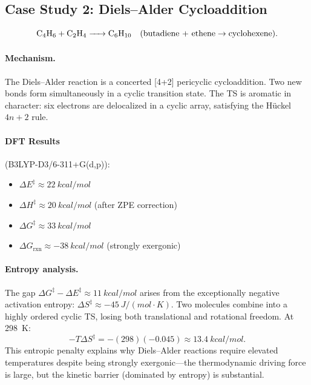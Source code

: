 \documentclass[11pt]{article}
\numberwithin{equation}{section}
\begin{document}
\subsection{Case Study 2: Diels--Alder Cycloaddition}

\begin{equation}
\ce{C4H6 + C2H4 -> C6H10} \quad (\text{butadiene + ethene} \to \text{cyclohexene}).
\end{equation}

\paragraph{Mechanism.} The Diels--Alder reaction is a concerted [4+2] pericyclic cycloaddition. Two new  bonds form simultaneously in a cyclic transition state. The TS is aromatic in character: six electrons are delocalized in a cyclic array, satisfying the H\"{u}ckel $4n+2$ rule.

\paragraph{DFT Results} (B3LYP-D3/6-311+G(d,p)):
\begin{itemize}
\item $\Delta E^\ddagger \approx \SI{22}{kcal/mol}$
\item $\Delta H^\ddagger \approx \SI{20}{kcal/mol}$ (after ZPE correction)
\item $\Delta G^\ddagger \approx \SI{33}{kcal/mol}$
\item $\Delta G_\text{rxn} \approx \SI{-38}{kcal/mol}$ (strongly exergonic)
\end{itemize}

\paragraph{Entropy analysis.} The gap $\Delta G^\ddagger - \Delta E^\ddagger \approx \SI{11}{kcal/mol}$ arises from the exceptionally negative activation entropy: $\Delta S^\ddagger \approx \SI{-45}{J/(mol\cdot K)}$. Two molecules combine into a highly ordered cyclic TS, losing both translational and rotational freedom. At \SI{298}{K}:
\begin{equation}
-T\Delta S^\ddagger = -(298)(-0.045) \approx \SI{+13.4}{kcal/mol}.
\end{equation}
This entropic penalty explains why Diels--Alder reactions require elevated temperatures despite being strongly exergonic---the thermodynamic driving force is large, but the kinetic barrier (dominated by entropy) is substantial.
\end{document}
